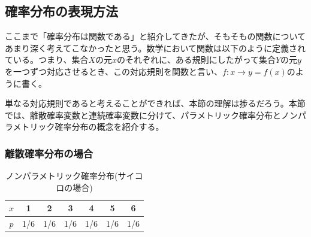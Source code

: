 \documentclass[dvipdfmx, 9pt, a4paper]{jsarticle}
\begin{document}
\subsection{確率分布の表現方法}
ここまで「確率分布は関数である」と紹介してきたが、そもそもの関数についてあまり深く考えてこなかったと思う。数学において関数は以下のように定義されている。つまり、集合$X$の元$x$のそれぞれに、ある規則にしたがって集合$Y$の元$y$を一つずつ対応させるとき、この対応規則を関数と言い、$f: x \to y=f(x)$のように書く。\par
単なる対応規則であると考えることができれば、本節の理解は捗るだろう。本節では、離散確率変数と連続確率変数に分けて、パラメトリック確率分布とノンパラメトリック確率分布の概念を紹介する。

\subsubsection{離散確率分布の場合}
\begin{table}[t]
\begin{center}
\caption{ノンパラメトリック確率分布(サイコロの場合)}
\begin{tabular}{c|cccccc}
$x$ & 1 & 2 & 3 & 4 & 5 & 6\\ \hline
$p$ & 1/6 & 1/6 & 1/6 & 1/6 & 1/6 & 1/6 \\
\end{tabular}
\end{center}
\end{table}
\end{document}
